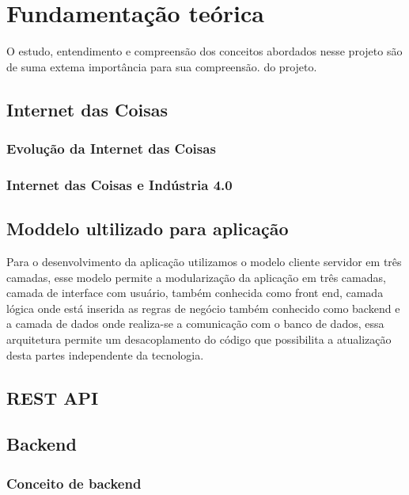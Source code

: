 \documentclass[../../layout.tex]{subfiles}
\begin{document}
\chapter{Fundamentação teórica}
\hspace*{3em}O estudo, entendimento e compreensão dos conceitos abordados nesse projeto são de suma extema importância para sua compreensão.
do projeto.

\section{Internet das Coisas}
\hspace*{3em}\blindtext[1]
\subsection{Evolução da Internet das Coisas}
\hspace*{3em}\blindtext[1]
\subsection{Internet das Coisas e Indústria 4.0}
\hspace*{3em}\blindtext[1]

\section{Moddelo ultilizado para aplicação}
\hspace*{3em}Para o desenvolvimento da aplicação  utilizamos o modelo cliente servidor em três camadas, esse modelo permite a modularização da aplicação  em três camadas,  camada de interface com usuário, também conhecida como front end, camada lógica onde está inserida as regras de negócio também conhecido como backend e a camada de dados  onde realiza-se a comunicação com o banco de dados, essa arquitetura permite um desacoplamento do código que possibilita a atualização desta partes independente da tecnologia. \cite{3layers}

\section{REST API}

\section{Backend}

\subsection{Conceito de backend}
\hspace*{3em}\blindtext[1]
\end{document}
